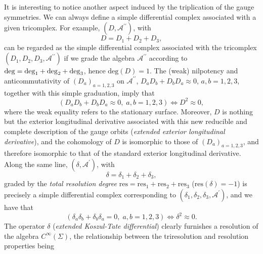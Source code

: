 \documentclass[a4paper,12pt]{article}
\begin{document}
It is interesting to notice another aspect induced by the triplication of
the gauge symmetries. We can always define a simple differential complex
associated with a given tricomplex. For example, $\left( D,\mathcal{A}%
^{\prime \prime }\right) $, with 
\begin{equation}
D=D_{1}+D_{2}+D_{3},  \label{sp3.e}
\end{equation}
can be regarded as the simple differential complex associated with the
tricomplex $\left( D_{1},D_{2},D_{3},\mathcal{A}^{\prime \prime }\right) $
if we grade the algebra $\mathcal{A}^{\prime \prime }$ according to $\mathrm{%
deg}=\mathrm{deg}_{1}+\mathrm{deg}_{2}+\mathrm{deg}_{3}$, hence $\mathrm{deg}%
\left( D\right) =1$. The (weak) nilpotency and anticommutativity of $\left(
D_{a}\right) _{a=1,2,3}$ on $\mathcal{A}^{\prime \prime }$, $%
D_{a}D_{b}+D_{b}D_{a}\approx 0$, $a,b=1,2,3$, together with this simple
graduation, imply that 
\begin{equation}
\left( D_{a}D_{b}+D_{b}D_{a}\approx 0,\;a,b=1,2,3\right) \Leftrightarrow
D^{2}\approx 0,  \label{sp3.f}
\end{equation}
where the weak equality refers to the stationary surface. Moreover, $D$ is
nothing but the exterior longitudinal derivative associated with this new
reducible and complete description of the gauge orbits (\textit{extended
exterior longitudinal derivative}), and the cohomology of $D$ is isomorphic
to those of $\left( D_{a}\right) _{a=1,2,3}$, and therefore isomorphic to
that of the standard exterior longitudinal derivative. Along the same line, $%
\left( \delta ,\mathcal{A}^{\prime }\right) $, with 
\begin{equation}
\delta =\delta _{1}+\delta _{2}+\delta _{3},  \label{sp3.g}
\end{equation}
graded by the \textit{total resolution degree} $\mathrm{res}=\mathrm{res}%
_{1}+\mathrm{res}_{2}+\mathrm{res}_{3}$ ($\mathrm{res}\left( \delta \right)
=-1$) is precisely a simple differential complex corresponding to $\left(
\delta _{1},\delta _{2},\delta _{3},\mathcal{A}^{\prime }\right) $, and we
have that 
\begin{equation}
\left( \delta _{a}\delta _{b}+\delta _{b}\delta _{a}=0,\;a,b=1,2,3\right)
\Leftrightarrow \delta ^{2}\approx 0.  \label{sp3.h}
\end{equation}
The operator $\delta $ (\textit{extended Koszul-Tate differential}) clearly
furnishes a resolution of the algebra $C^{\infty }\left( \Sigma \right) $,
the relationship between the triresolution and resolution properties being 
\end{document}
